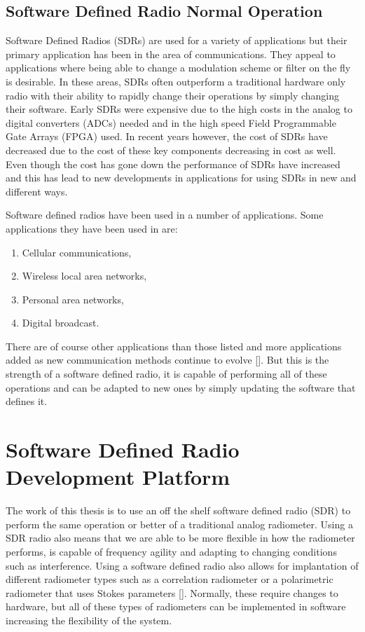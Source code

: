 \subsection{Software Defined Radio Normal Operation}
Software Defined Radios (SDRs) are used for a variety of applications but their primary application has been in the area of communications.  They appeal to applications where being able to change a modulation scheme or filter on the fly is desirable.  In these areas, SDRs often outperform a traditional hardware only radio with their ability to rapidly change their operations by simply changing their software.  Early SDRs were expensive due to the high costs in the analog to digital converters (ADCs) needed and in the high speed Field Programmable Gate Arrays (FPGA) used.  In recent years however, the cost of SDRs have decreased due to the cost of these key components decreasing in cost as well.  Even though the cost has gone down the performance of SDRs have increased and this has lead to new developments in applications for using SDRs in new and different ways.

Software defined radios have been used in a number of applications.  Some applications they have been used in are:

\begin{enumerate}
\item Cellular communications,
\item Wireless local area networks,
\item Personal area networks,
\item Digital broadcast.
\end{enumerate}

There are of course other applications than those listed and more applications added as new communication methods continue to evolve [\cite{jondral2005software}].  But this is the strength of a software defined radio, it is capable of performing all of these operations and can be adapted to new ones by simply updating the software that defines it.

\section{Software Defined Radio Development Platform} \label{SDR_platform}
The work of this thesis is to use an off the shelf software defined radio (SDR) to perform the same operation or better of a traditional analog radiometer.  Using a SDR radio also means that we are able to be more flexible in how the radiometer performs, is capable of frequency agility and adapting to changing conditions such as interference.  Using a software defined radio also allows for implantation of different radiometer types such as a correlation radiometer or a polarimetric radiometer that uses Stokes parameters [\cite{Wang}].  Normally, these require changes to hardware, but all of these types of radiometers can be implemented in software increasing the flexibility of the system.  

